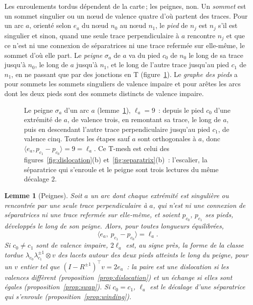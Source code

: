 \documentclass[11pt,a4paper]{article}
\newtheorem{lemma}{Lemme}
\newcommand{\lean}[1]{\texttt{\detokenize{#1}}}
\newenvironment{evidence}[3][]{}{}
\begin{document}
Les enroulements tordus dépendent de la carte\,; les peignes, non. Un
\emph{sommet} est un sommet singulier ou un nœud de valence quatre d'où partent
des traces. Pour un arc $a$, orienté selon $e_a$ du nœud $n_0$ au nœud $n_1$,
le \emph{pied} de $n_j$ est $n_j$ s'il est singulier et sinon, quand une seule
trace perpendiculaire à $a$ rencontre $n_j$ et que ce n'est ni une connexion
de séparatrices ni une trace refermée sur elle-même, le sommet d'où elle part.
Le \emph{peigne} $\sigma_a$ de $a$ va du pied
$c_0$ de $n_0$ le long de sa trace jusqu'à $n_0$, le long de $a$ jusqu'à
$n_1$, et le long de l'autre trace jusqu'au pied $c_1$ de $n_1$, en ne passant
que par des jonctions en T (figure~\ref{fig:comb}). Le \emph{graphe des pieds}
a pour sommets les sommets singuliers de valence impaire et pour arêtes les
arcs dont les deux pieds sont des sommets distincts de valence impaire.

\begin{figure}[t]
\centering

\caption{Le peigne $\sigma_a$ d'un arc $a$ (lemme~\ref{lem:comb}), $\ell_a =
9$~: depuis le pied $c_0$ d'une extrémité de $a$, de valence trois, en
remontant sa trace, le long de $a$, puis en descendant l'autre trace
perpendiculaire jusqu'au pied $c_1$, de valence cinq. Toutes les étapes sauf
$a$ sont orthogonales à $a$, donc $\langle e_a, p_{c_1} - p_{c_0} \rangle = 9
= \ell_a$. Ce T-mesh est celui des figures~\ref{fig:dislocation}(b)
et~\ref{fig:separatrix}(b)~: l'escalier, la séparatrice qui s'enroule et le
peigne sont trois lectures du même décalage $2$.}
\label{fig:comb}
\end{figure}

\begin{evidence}{core}{\lean{comb_reading}, \lean{Pairing.Comb.reading}\,; les formes~: \lean{Combs.comb_dislocation}, \lean{Combs.comb_exchange}, depuis le peigne \lean{Combs.Comb.dislocation}, \lean{Combs.Comb.exchange}\,; les pieds existent sur 850 des 3\,009 arcs de 50 instances aléatoires\,; supposé~: les pieds existent, les traces perpendiculaires se développent en droites, $e_a$ est un axe de la carte du peigne\,; le cas $c_0 = c_1$ n'est pas formalisé}
\begin{lemma}[Peignes]\label{lem:comb}
Soit $a$ un arc dont chaque extrémité est singulière ou rencontrée par une
seule trace perpendiculaire à $a$, qui n'est ni une connexion de séparatrices
ni une trace refermée sur elle-même, et soient $p_{c_0}$, $p_{c_1}$ ses pieds,
développés le long de son peigne. Alors, pour toutes longueurs équilibrées,
\[
  \langle e_a,\ p_{c_1} - p_{c_0} \rangle = \ell_a .
\]
Si $c_0 \neq c_1$ sont de valence impaire, $2\ell_a$ est, au signe près, la
forme de la classe tordue $\lambda_{c_0}\lambda_{c_1}^{\pm1} \otimes v$ des
lacets autour des deux pieds atteints le long du peigne, pour un $v$ entier
tel que $(I - R^{\pm1})^\top v = 2e_a$~: la paire est une dislocation si les
valences diffèrent (proposition~\ref{prop:dislocation}) et un échange si elles
sont égales (proposition~\ref{prop:swap}). Si $c_0 = c_1$, $\ell_a$ est le
décalage d'une séparatrice qui s'enroule (proposition~\ref{prop:winding}).
\end{lemma}
\end{evidence}
\end{document}

